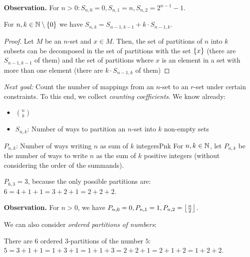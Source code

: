 \documentclass[language=english]{../../Template/TemplateLecture}
\begin{document}
\textbf{Observation.} For $n > 0: S_{n,0} = 0, S_{n,1} = n, S_{n,2} = 2^{n-1} - 1$.

\begin{prop}
    For $n, k \in \IN \setminus \set{0}$ we have $S_{n,k} = S_{n-1, k-1} + k \cdot S_{n-1, k}$.
\end{prop}

\begin{proof}
    Let $M$ be an $n$-set and $x \in M$. Then, the set of partitions of $n$ into $k$ subsets can be decomposed in the set of partitions with the set $\set{x}$ (there are $S_{n-1, k-1}$ of them) and the set of partitions where $x$ is an element in a set with more than one element (there are $k \cdot S_{n-1, k}$ of them)
\end{proof}



\emph{Next goal:} Count the number of mappings from an $n$-set to an $r$-set under certain constraints. To this end, we collect \emph{counting coefficients}. We know already:
\begin{itemize}
    \item $\binom{n}{k}$
    \item $S_{n,k}$: Number of ways to partition an $n$-set into $k$ non-empty sets
\end{itemize}

\begin{defi}{$P_{n,k}$: Number of ways writing $n$ as sum of $k$ integers}{Pnk}
    For $n, k \in \IN$, let $P_{n,k}$ be the number of ways to write $n$ as the sum of $k$ positive integers (without considering the order of the summands).
\end{defi}

\begin{beispiel}
    $P_{6,3} = 3$, because the only possible partitions are: $6 = 4 + 1 + 1 = 3 + 2 + 1 = 2 + 2 + 2$.
\end{beispiel}

\textbf{Observation.} For $n > 0$, we have $P_{n,0} = 0, P_{n,1} = 1, P_{n,2} = \floor*{\frac{n}{2}}$.

We can also consider \emph{ordered partitions of numbers}:

\begin{beispiel}
    There are 6 ordered $3$-partitions of the number $5$: $5 = 3 + 1 + 1 = 1 + 3 + 1 = 1 + 1 + 3 = 2 + 2 + 1 = 2 + 1 + 2 = 1 + 2 + 2$.
\end{beispiel}
\end{document}
